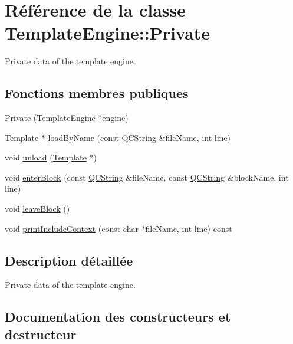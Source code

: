 \hypertarget{class_template_engine_1_1_private}{}\section{Référence de la classe Template\+Engine\+:\+:Private}
\label{class_template_engine_1_1_private}


\hyperlink{class_template_engine_1_1_private}{Private} data of the template engine.  


\subsection*{Fonctions membres publiques}
\begin{DoxyCompactItemize}
\item 
\hyperlink{class_template_engine_1_1_private_a573476f02e16963cad2898dc3a98ac9e}{Private} (\hyperlink{class_template_engine}{Template\+Engine} $\ast$engine)
\item 
\hyperlink{class_template}{Template} $\ast$ \hyperlink{class_template_engine_1_1_private_aa17576bb84e91b768291fe06a44c1273}{load\+By\+Name} (const \hyperlink{class_q_c_string}{Q\+C\+String} \&file\+Name, int line)
\item 
void \hyperlink{class_template_engine_1_1_private_ad0f02281d0062d8b227b93c5b5e41ce5}{unload} (\hyperlink{class_template}{Template} $\ast$)
\item 
void \hyperlink{class_template_engine_1_1_private_ac0e733a030a716b6b5dd1900638d29fd}{enter\+Block} (const \hyperlink{class_q_c_string}{Q\+C\+String} \&file\+Name, const \hyperlink{class_q_c_string}{Q\+C\+String} \&block\+Name, int line)
\item 
void \hyperlink{class_template_engine_1_1_private_a72b28eb7694ad55a48b6bdf49b72b636}{leave\+Block} ()
\item 
void \hyperlink{class_template_engine_1_1_private_ab0a8d2624109fe3b7089dd4c5fcb0231}{print\+Include\+Context} (const char $\ast$file\+Name, int line) const 
\end{DoxyCompactItemize}


\subsection{Description détaillée}
\hyperlink{class_template_engine_1_1_private}{Private} data of the template engine. 

\subsection{Documentation des constructeurs et destructeur}
\hypertarget{class_template_engine_1_1_private_a573476f02e16963cad2898dc3a98ac9e}{}
